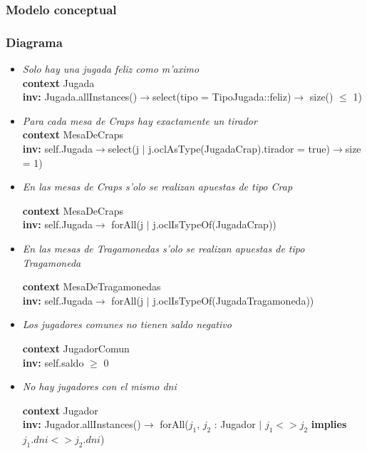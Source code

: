\subsubsection{Modelo conceptual}

\subsubsection{Diagrama}

\begin{itemize}
 \item \textit{ Solo hay una jugada feliz como m'aximo \\}
  \textbf{context} Jugada 
  \\ \textbf{inv:} 
  Jugada.allInstances()$\rightarrow$select(tipo = TipoJugada::feliz)$\rightarrow $ size() $\leq$ 1)


\item \textit{ Para cada mesa de Craps hay exactamente un tirador \\}
\textbf{context}  MesaDeCraps \\ \textbf{inv:} 
  self.Jugada$\rightarrow$select(j $|$ j.oclAsType(JugadaCrap).tirador = true)$\rightarrow$size = 1)


\item \textit{En las mesas de Craps s'olo se realizan apuestas de tipo Crap} 

\textbf{context}  MesaDeCraps \\ \textbf{inv:} 
  self.Jugada$\rightarrow$ forAll(j $|$ j.oclIsTypeOf(JugadaCrap))


\item \textit{En las mesas de Tragamonedas s'olo se realizan apuestas de tipo Tragamoneda}

\textbf{context}  MesaDeTragamonedas \\ \textbf{inv:} 
  self.Jugada$\rightarrow$ forAll(j $|$ j.oclIsTypeOf(JugadaTragamoneda))

\item \textit{Los jugadores comunes no tienen saldo negativo}

\textbf{context}  JugadorComun \\ \textbf{inv:} 
  self.saldo $\geq$ 0

\item \textit{ No hay jugadores con el mismo dni}

\textbf{context}  Jugador \\ \textbf{inv:} 
  Jugador.allInstances()$\rightarrow$ forAll($j_{1}$, $j_{2}$ : Jugador $|$ $j_{1} < > j_{2}$ \textbf{implies} $j_{1}.dni < > j_{2}.dni$)



\end{itemize}
